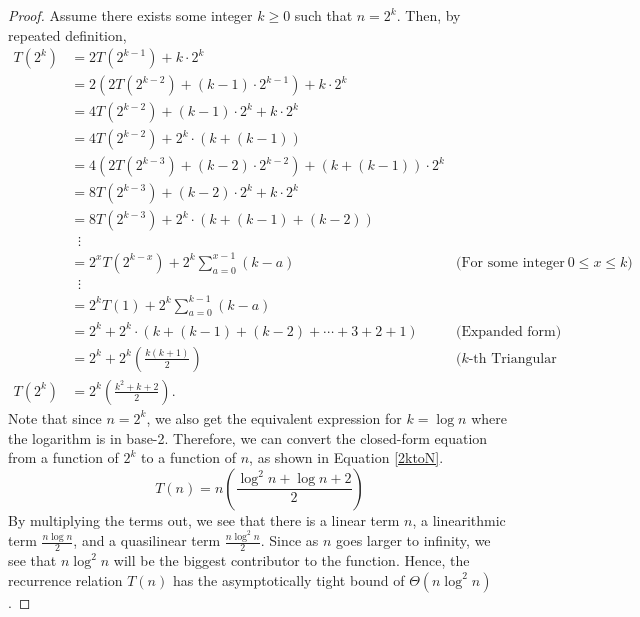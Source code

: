 \documentclass{report}
\begin{document}
\begin{proof}
	Assume there exists some integer $k \geq 0$ such that $n=2^k$. Then, by repeated definition,
	\begin{align*}
		T(2^k) &= 2T(2^{k-1}) + k\cdot2^k \\
			&= 2(2T(2^{k-2}) + (k-1)\cdot2^{k-1}) + k\cdot2^k \\
			&= 4T(2^{k-2}) + (k-1)\cdot2^{k} + k\cdot2^k \\
			&= 4T(2^{k-2}) + 2^k \cdot (k + (k-1)) \\
			&= 4(2T(2^{k-3}) + (k-2)\cdot2^{k-2}) + (k + (k-1))\cdot2^k \\
			&= 8T(2^{k-3}) + (k-2)\cdot2^{k} + k\cdot2^k \\
			&= 8T(2^{k-3}) + 2^k \cdot (k + (k-1) + (k-2)) \\
			&\;\;\vdots \\
			&= 2^xT(2^{k-x}) + 2^k \sum_{a=0}^{x-1}(k-a)  &\text{(For some integer $0 \leq x \leq k$)}\\
			&\;\;\vdots \\
			&= 2^kT(1) + 2^k \sum_{a=0}^{k-1}(k-a) \\
			&= 2^k + 2^k \cdot (k + (k-1) + (k-2) + \cdots + 3 + 2 + 1) &\text{(Expanded form)} \\
			&= 2^k + 2^k \left(\frac{k(k+1)}{2}\right) &\text{($k$-th Triangular number)}\\
		T(2^k) &= 2^k \left(\frac{k^2 + k + 2}{2}\right).
	\end{align*}
	Note that since $n=2^k$, we also get the equivalent expression for $k=\log n$ where the logarithm is in base-2. Therefore, we can convert the closed-form equation from a function of $2^k$ to a function of $n$, as shown in Equation \ref{2ktoN}.
	\begin{equation}
		T(n) = n\left(\frac{\log^2n + \log n + 2}{2}\right)
		\label{2ktoN}
	\end{equation}
	By multiplying the terms out, we see that there is a linear term $n$, a linearithmic term $\frac{n\log n}{2}$, and a quasilinear term $\frac{n\log^2n}{2}$. Since as $n$ goes larger to infinity, we see that $n\log^2n$ will be the biggest contributor to the function. Hence, the recurrence relation $T(n)$ has the asymptotically tight bound of $\Theta\left(n\log^2n\right)$.
	
\end{proof}
\end{document}
